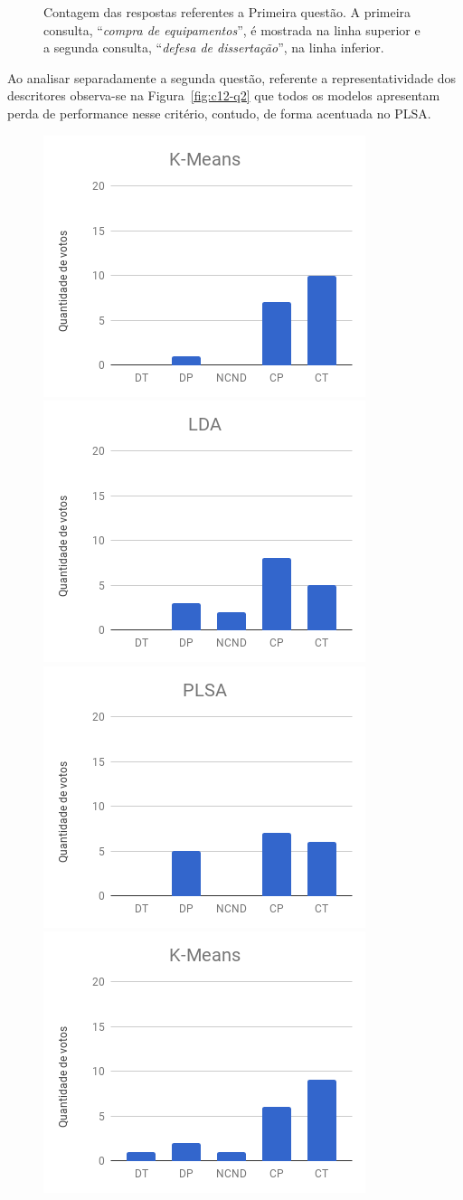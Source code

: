 \begin{figure}[!h]
	\caption{Contagem das respostas referentes a Primeira questão. A primeira consulta, ``\textit{compra de equipamentos}'', é mostrada na linha superior e a segunda consulta, ``\textit{defesa de dissertação}'', na linha inferior.}
	\label{fig:c12-q1}
\end{figure}



Ao analisar separadamente a segunda questão, referente a representatividade dos descritores observa-se na Figura~\ref{fig:c12-q2} que todos os modelos apresentam perda de performance nesse critério, contudo, de forma acentuada no PLSA. 



\begin{figure}[!h] \centering     %

		\includegraphics[width=.31\textwidth]{conteudo/capitulos/figs/figuras-experimento/C1-Q2-KMeans.png}
		\includegraphics[width=.31\textwidth]{conteudo/capitulos/figs/figuras-experimento/C1-Q2-LDA.png}
		\includegraphics[width=.31\textwidth]{conteudo/capitulos/figs/figuras-experimento/C1-Q2-PLSA.png}
		\includegraphics[width=.31\textwidth]{conteudo/capitulos/figs/figuras-experimento/C2-Q2-KMeans.png}

\end{figure}
